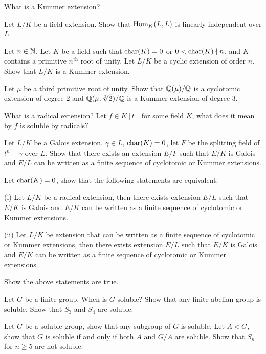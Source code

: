 \begin{question}{32}
    What is a Kummer extension?

    Let $L/K$ be a field extension. Show that $\text{Hom}_K(L,L)$ is linearly independent over $L$.

    Let $n \in \mathbb{N}$. Let $K$ be a field such that $\text{char}(K) = 0$ or $0 < \text{char}(K) \nmid n$, and $K$ contains a primitive $n^\text{th}$ root of unity. Let $L/K$ be a cyclic extension of order $n$. Show that $L/K$ is a Kummer extension.

    Let $\mu$ be a third primitive root of unity. Show that $\mathbb{Q}(\mu)/\mathbb{Q}$ is a cyclotomic extension of degree $2$ and $\mathbb{Q}(\mu,\sqrt[3]{2})/\mathbb{Q}$ is a Kummer extension of degree $3$.
\end{question}

\begin{question}{33}
    What is a radical extension? Let $f \in K[t]$ for some field $K$, what does it mean by $f$ is soluble by radicals?

    Let $L/K$ be a Galois extension, $\gamma \in L$, $\text{char}(K) = 0$, let $F$ be the splitting field of $t^n - \gamma$ over $L$. Show that there exists an extension $E/F$ such that $E/K$ is Galois and $E/L$ can be written as a finite sequence of cyclotomic or Kummer extensions.

    Let $\text{char}(K) = 0$, show that the following statements are equivalent:

    (i) Let $L/K$ be a radical extension, then there exists extension $E/L$ such that $E/K$ is Galois and $E/K$ can be written as a finite sequence of cyclotomic or Kummer extensions.

    (ii) Let $L/K$ be extension that can be written as a finite sequence of cyclotomic or Kummer extensions, then there exists extension $E/L$ such that $E/K$ is Galois and $E/K$ can be written as a finite sequence of cyclotomic or Kummer extensions.

    Show the above statements are true.
\end{question}

\begin{question}{34}
    Let $G$ be a finite group. When is $G$ soluble? Show that any finite abelian group is soluble. Show that $S_3$ and $S_4$ are soluble.

    Let $G$ be a soluble group, show that any subgroup of $G$ is soluble. Let $A \lhd G$, show that $G$ is soluble if and only if both $A$ and $G/A$ are soluble. Show that $S_n$ for $n \geq 5$ are not soluble.
\end{question}

